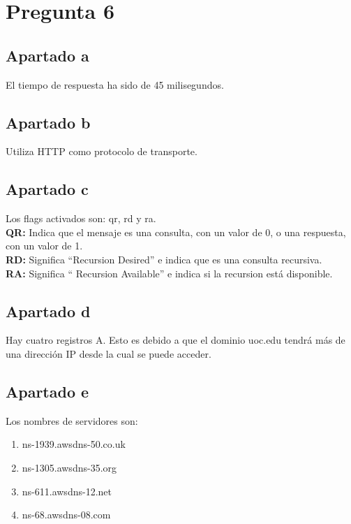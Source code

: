 \documentclass[spanish]{article}
\begin{document}
\section{Pregunta 6}

\subsection{Apartado a}

El tiempo de respuesta ha sido de 45 milisegundos.

\subsection{Apartado b}

Utiliza HTTP como protocolo de transporte.

\subsection{Apartado c}

Los flags activados son: qr, rd y ra.\\

\textbf{QR:} Indica que el mensaje es una consulta, con un
valor de 0, o una respuesta, con un valor de 1.\\

\textbf{RD:} Significa ``Recursion Desired'' e indica que es
una consulta recursiva.\\

\textbf{RA:} Significa `` Recursion Available'' e indica si
la recursion está disponible.

\subsection{Apartado d}

Hay cuatro registros A. Esto es debido a que el dominio
uoc.edu tendrá más de una dirección IP desde la cual se
puede acceder.

\newpage

\subsection{Apartado e}

Los nombres de servidores son:

\begin{enumerate}
\item ns-1939.awsdns-50.co.uk\\
\item ns-1305.awsdns-35.org\\
\item ns-611.awsdns-12.net\\
\item ns-68.awsdns-08.com\\
\end{enumerate}
\end{document}
